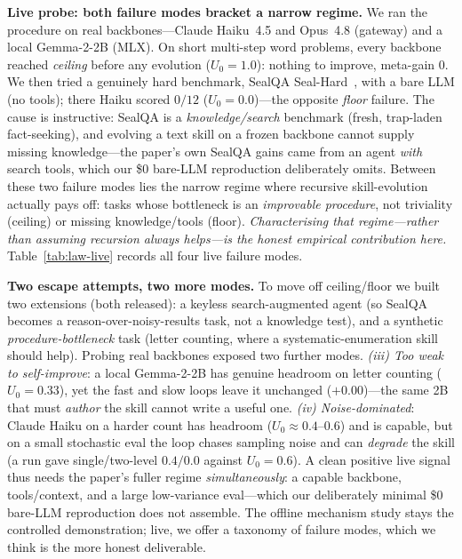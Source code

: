 \documentclass[11pt]{article}
\begin{document}
\textbf{Live probe: both failure modes bracket a narrow regime.} We ran the
procedure on real backbones---Claude Haiku~4.5 and Opus~4.8 (gateway) and a local
Gemma-2-2B (MLX). On short multi-step word problems, every backbone reached
\emph{ceiling} before any evolution ($U_0{=}1.0$): nothing to improve, meta-gain
$0$. We then tried a genuinely hard benchmark, SealQA Seal-Hard~\citep{pham2025sealqa},
with a bare LLM (no tools); there Haiku scored $0/12$ ($U_0{=}0.0$)---the opposite
\emph{floor} failure. The cause is instructive: SealQA is a \emph{knowledge/search}
benchmark (fresh, trap-laden fact-seeking), and evolving a text skill on a frozen
backbone cannot supply missing knowledge---the paper's own SealQA gains came from an
agent \emph{with} search tools, which our \$0 bare-LLM reproduction deliberately
omits. Between these two failure modes lies the narrow regime where recursive
skill-evolution actually pays off: tasks whose bottleneck is an \emph{improvable
procedure}, not triviality (ceiling) or missing knowledge/tools (floor).
\emph{Characterising that regime---rather than assuming recursion always
helps---is the honest empirical contribution here.} Table~\ref{tab:law-live}
records all four live failure modes.

\textbf{Two escape attempts, two more modes.} To move off ceiling/floor we built
two extensions (both released): a keyless search-augmented agent (so SealQA becomes
a reason-over-noisy-results task, not a knowledge test), and a synthetic
\emph{procedure-bottleneck} task (letter counting, where a systematic-enumeration
skill should help). Probing real backbones exposed two further modes.
\emph{(iii) Too weak to self-improve}: a local Gemma-2-2B has genuine headroom on
letter counting ($U_0{=}0.33$), yet the fast and slow loops leave it unchanged
($+0.00$)---the same 2B that must \emph{author} the skill cannot write a useful one.
\emph{(iv) Noise-dominated}: Claude Haiku on a harder count has headroom
($U_0{\approx}0.4$--$0.6$) and is capable, but on a small stochastic eval the loop
chases sampling noise and can \emph{degrade} the skill (a run gave single/two-level
$0.4/0.0$ against $U_0{=}0.6$). A clean positive live signal thus needs the paper's
fuller regime \emph{simultaneously}: a capable backbone, tools/context, and a large
low-variance eval---which our deliberately minimal \$0 bare-LLM reproduction does
not assemble. The offline mechanism study stays the controlled demonstration; live,
we offer a taxonomy of failure modes, which we think is the more honest deliverable.
\end{document}
